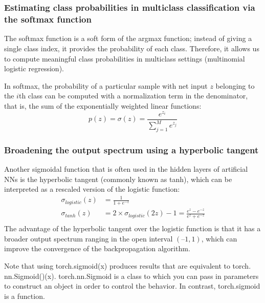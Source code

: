 \chapter{\label{Ch12}}
\section{}
\subsection{Estimating class probabilities in multiclass classification via the softmax function}
The softmax function is a soft form of the argmax function; instead of giving a single class index, it provides the probability of each class. Therefore, it allows us to compute meaningful class probabilities in multiclass settings (multinomial logistic regression).

In softmax, the probability of a particular sample with net input $z$ belonging to the $i$th class can be computed with a normalization term in the denominator, that is, the sum of the exponentially weighted linear functions:
\begin{equation}
    p(z)=\sigma(z)=\frac{e^{z_i}}{\sum_{j=1}^{M}e^{z_j}}
\end{equation}
\subsection{Broadening the output spectrum using a hyperbolic tangent}
Another sigmoidal function that is often used in the hidden layers of artificial NNs is the hyperbolic tangent (commonly known as tanh), which can be interpreted as a rescaled version of the logistic function:
\begin{equation}
    \begin{aligned}
        \sigma_{logistic}(z) & =\frac{1}{1+e^{-z}}                                            \\
        \sigma_{tanh}(z)     & =2\times \sigma_{logistic}(2z)-1=\frac{e^z-e^{-z}}{e^z+e^{-z}} \\
    \end{aligned}
\end{equation}
The advantage of the hyperbolic tangent over the logistic function is that it has a broader output spectrum ranging in the open interval $(–1, 1)$, which can improve the convergence of the backpropagation algorithm.

Note that using torch.sigmoid(x) produces results that are equivalent to torch. nn.Sigmoid()(x). torch.nn.Sigmoid is a class to which you can pass in parameters to construct an object in order to control the behavior. In contrast, torch.sigmoid is a function.

